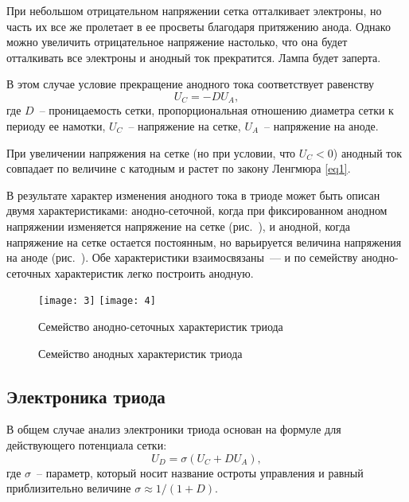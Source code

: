 При небольшом отрицательном напряжении сетка отталкивает электроны, но часть их
все же пролетает в ее просветы благодаря притяжению анода. Однако можно
увеличить отрицательное напряжение настолько, что она будет отталкивать все
электроны и анодный ток прекратится. Лампа будет заперта.

В этом случае условие прекращение анодного тока соответствует равенству
\begin{equation}
  U_C = -DU_A,
  \label{eq2}
\end{equation}
где \( D \)~-- проницаемость сетки, пропорциональная отношению диаметра сетки
к периоду ее намотки, \( U_C \)~-- напряжение на сетке, \( U_A \)~-- напряжение на
аноде.

При увеличении напряжения на сетке (но при условии, что \( U_C < 0 \)) анодный
ток совпадает по величине с катодным и растет по закону Ленгмюра \eqref{eq1}.

В результате характер изменения анодного тока в триоде может быть описан двумя
характеристиками: анодно-сеточной, когда при фиксированном анодном напряжении
изменяется напряжение на сетке (рис.~), и анодной, когда
напряжение на сетке остается постоянным, но варьируется величина напряжения на
аноде (рис.~). Обе характеристики взаимосвязаны~--- и по семейству
анодно-сеточных характеристик легко построить анодную.

\begin{figure}[ht]
  \center
  \texttt{[image: 3]} \hspace{2em}
  \texttt{[image: 4]}
  \parbox{.45\textwidth}{\caption{Семейство анодно-сеточных характеристик
  триода}\label{pic3}} \hspace{2em}
  \parbox{.45\textwidth}{\caption{Семейство анодных характеристик триода}
  \label{pic4}}
\end{figure}

\subsection{Электроника триода}

В общем случае анализ электроники триода основан на формуле для действующего
потенциала сетки:
\begin{equation}
  U_D = \sigma (U_C + D U_A),
  \label{eqel}
\end{equation}
где \( \sigma \)~-- параметр, который носит название остроты управления и
равный приблизительно величине \( \sigma \approx 1/(1 + D) \).


